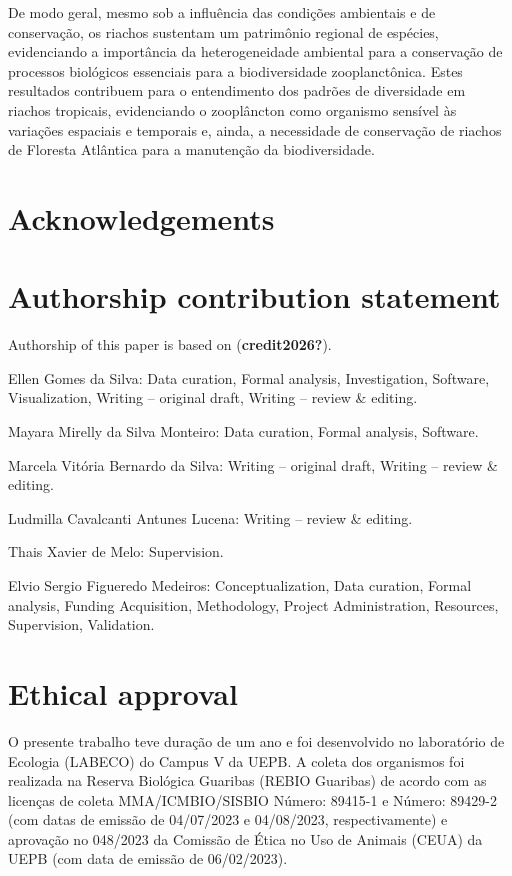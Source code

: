 \documentclass[
  letterpaper,
  DIV=11,
  numbers=noendperiod]{scrartcl}
\begin{document}
De modo geral, mesmo sob a influência das condições ambientais e de
conservação, os riachos sustentam um patrimônio regional de espécies,
evidenciando a importância da heterogeneidade ambiental para a
conservação de processos biológicos essenciais para a biodiversidade
zooplanctônica. Estes resultados contribuem para o entendimento dos
padrões de diversidade em riachos tropicais, evidenciando o zooplâncton
como organismo sensível às variações espaciais e temporais e, ainda, a
necessidade de conservação de riachos de Floresta Atlântica para a
manutenção da biodiversidade.

\section*{Acknowledgements}\label{acknowledgements}

\section*{Authorship contribution
statement}\label{authorship-contribution-statement}

Authorship of this paper is based on (\textbf{credit2026?}).

Ellen Gomes da Silva: Data curation, Formal analysis, Investigation,
Software, Visualization, Writing -- original draft, Writing -- review \&
editing.

Mayara Mirelly da Silva Monteiro: Data curation, Formal analysis,
Software.

Marcela Vitória Bernardo da Silva: Writing -- original draft, Writing --
review \& editing.

Ludmilla Cavalcanti Antunes Lucena: Writing -- review \& editing.

Thais Xavier de Melo: Supervision.

Elvio Sergio Figueredo Medeiros: Conceptualization, Data curation,
Formal analysis, Funding Acquisition, Methodology, Project
Administration, Resources, Supervision, Validation.

\section*{Ethical approval}\label{ethical-approval}

O presente trabalho teve duração de um ano e foi desenvolvido no
laboratório de Ecologia (LABECO) do Campus V da UEPB. A coleta dos
organismos foi realizada na Reserva Biológica Guaribas (REBIO Guaribas)
de acordo com as licenças de coleta MMA/ICMBIO/SISBIO Número: 89415-1 e
Número: 89429-2 (com datas de emissão de 04/07/2023 e 04/08/2023,
respectivamente) e aprovação no 048/2023 da Comissão de Ética no Uso de
Animais (CEUA) da UEPB (com data de emissão de 06/02/2023).
\end{document}

